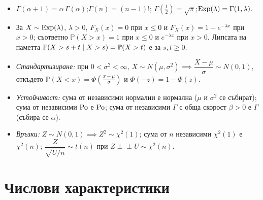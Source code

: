 \begin{itemize}\itemsep2pt
  \item $\Gamma(\alpha+1) = \alpha\,\Gamma(\alpha)$;\quad $\Gamma(n) = (n-1)!$;\quad
        $\Gamma(\tfrac12) = \sqrt{\pi}$;\quad $\operatorname{Exp}(\lambda) = \Gamma(1,\lambda)$.
  \item За $X\sim\operatorname{Exp}(\lambda)$, $\lambda>0$,
        $F_X(x)=0$ при $x\le0$ и $F_X(x)=1-e^{-\lambda x}$ при $x>0$;
        съответно $\mathbb P(X>x)=1$ при $x\le0$ и $e^{-\lambda x}$ при $x>0$.
        Липсата на паметта $\mathbb{P}(X > s+t \mid X > s) = \mathbb{P}(X > t)$
        е за $s,t\ge0$.
  \item \emph{Стандартизиране:} при $0<\sigma^2<\infty$,
        $X \sim N(\mu,\sigma^2) \implies \dfrac{X-\mu}{\sigma} \sim N(0,1)$,
        откъдето $\mathbb{P}(X < x) = \Phi\!\left(\frac{x-\mu}{\sigma}\right)$ и
        $\Phi(-z) = 1-\Phi(z)$.
  \item \emph{Устойчивост:} сума от независими нормални е нормална
        ($\mu$ и $\sigma^2$ се събират); сума от независими $\operatorname{Po}$ е $\operatorname{Po}$;
        сума от независими $\Gamma$ с обща скорост $\beta>0$ е $\Gamma$
        (събира се $\alpha$).
  \item \emph{Връзки:} $Z \sim N(0,1) \implies Z^2 \sim \chi^2(1)$;\quad
        сума от $n$ независими $\chi^2(1)$ е $\chi^2(n)$;\quad
        $\dfrac{Z}{\sqrt{U/n}} \sim t(n)$ при $Z \perp\!\!\!\perp U \sim \chi^2(n)$.
\end{itemize}

\section{Числови характеристики}

